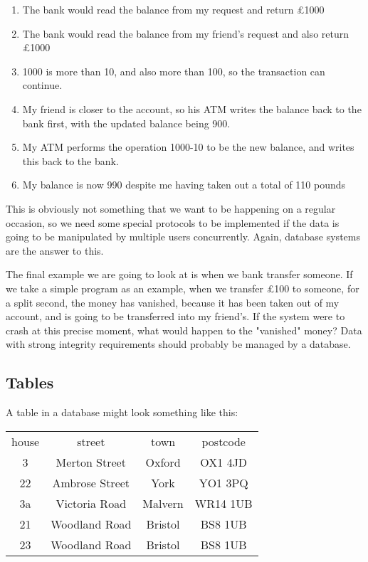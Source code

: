 \documentclass[11pt,a4paper,titlepage,dvipsnames,cmyk]{scrartcl}
\begin{document}
\begin{enumerate}
    \item The bank would read the balance from my request and return £1000
    \item The bank would read the balance from my friend's request and
        also return £1000
    \item 1000 is more than 10, and also more than 100, so the
        transaction can continue.
    \item My friend is closer to the account, so his ATM writes the
        balance back to the bank first, with the updated balance being
        900.
    \item My ATM performs the operation 1000-10 to be the new balance, and
        writes this back to the bank.
    \item My balance is now 990 despite me having taken out a total of 110
        pounds
\end{enumerate}

This is obviously not something that we want to be happening on a regular
occasion, so we need some special protocols to be implemented if the data
is going to be manipulated by multiple users concurrently. Again, database
systems are the answer to this.

The final example we are going to look at is when we bank transfer
someone. If we take a simple program as an example, when we transfer £100
to someone, for a split second, the money has vanished, because it has
been taken out of my account, and is going to be transferred into my
friend's. If the system were to crash at this precise moment, what would
happen to the "vanished" money? Data with strong integrity requirements
should probably be managed by a database.

\subsection{Tables}%
\label{sub:Tables}

A table in a database might look something like this:

\begin{center}
    \begin{tabular}{c|c|c|c}
        house & street & town & postcode \\
        \hhline{=|=|=|=}
        3 & Merton Street & Oxford & OX1 4JD \\
        \hline
        22 & Ambrose Street & York & YO1 3PQ \\
        \hline
        3a & Victoria Road & Malvern & WR14 1UB \\
        \hline
        21 & Woodland Road & Bristol & BS8 1UB \\
        \hline
        23 & Woodland Road & Bristol & BS8 1UB \\
    \end{tabular}
\end{center}
\end{document}
